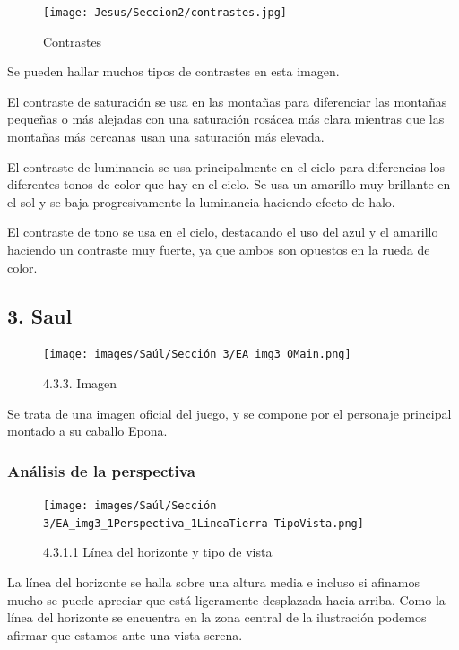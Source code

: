 \documentclass[12pt]{article}
\begin{document}
          \begin{figure}[H]
            \centering
            \texttt{[image: Jesus/Seccion2/contrastes.jpg]}
            \caption{Contrastes}
          \end{figure}

          Se pueden hallar muchos tipos de contrastes en esta imagen. 

          El contraste de saturación se usa en las montañas para diferenciar las montañas pequeñas o más alejadas con una saturación rosácea más clara mientras que las montañas más cercanas usan una saturación más elevada. 

          El contraste de luminancia se usa principalmente en el cielo para diferencias los diferentes tonos de color que hay en el cielo. Se usa un amarillo muy brillante en el sol y se baja progresivamente la luminancia haciendo efecto de halo. 

          El contraste de tono se usa en el cielo, destacando el uso del azul y el amarillo haciendo un contraste muy fuerte, ya que ambos son opuestos en la rueda de color. 

          \newpage


    \subsection{3. Saul}
    \begin{figure}[H]
      \centering
      \texttt{[image: images/Saúl/Sección 3/EA\_img3\_0Main.png]}
      \caption{\small 4.3.3. Imagen}
    \end{figure}
    Se trata de una imagen oficial del juego, y se compone por el personaje principal montado a su caballo Epona.

    
        \subsubsection{Análisis de la perspectiva}


    \begin{figure}[H]
      \centering
      \texttt{[image: images/Saúl/Sección 3/EA\_img3\_1Perspectiva\_1LineaTierra-TipoVista.png]}
      \caption{\small 4.3.1.1 Línea del horizonte y tipo de vista}
    \end{figure}

    La línea del horizonte se halla sobre una altura media e incluso si afinamos mucho se puede apreciar que está ligeramente desplazada hacia arriba. Como la línea del horizonte se encuentra en la zona central de la ilustración podemos afirmar que estamos ante una vista serena.
\end{document}
